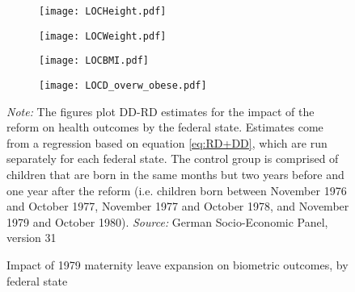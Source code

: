 \documentclass[a4paper ]{article}
\begin{document}
    
    
    
    
    
    
    
    
    
    
    
    
    
    
    
    
    
    
    
    
    
    
    
    
    
    
\clearpage
\newpage
\begin{figure}[p]
\begin{subfigure}[h]{0.48\textwidth}\centering
	\texttt{[image: LOCHeight.pdf]}
\end{subfigure}
\quad
\begin{subfigure}[h]{0.48\textwidth}\centering
	\texttt{[image: LOCWeight.pdf]}
\end{subfigure}
\par\bigskip
\begin{subfigure}[h]{0.48\textwidth}\centering
	\texttt{[image: LOCBMI.pdf]}
\end{subfigure}
\quad
\begin{subfigure}[h]{0.48\textwidth}\centering
	\texttt{[image: LOCD\_overw\_obese.pdf]}
\end{subfigure}
\caption{Impact of 1979 maternity leave expansion on biometric outcomes, by federal state}\label{fig: LOC_BM}
\begin{minipage}{\textwidth} %
{\footnotesize \textit{Note:} The figures plot DD-RD estimates for the impact of the reform on health outcomes by the federal state. Estimates come from a regression based on equation \ref{eq:RD+DD}, which are run separately for each federal state. The control group is comprised of children that are born in the same months but two years before and one year after the reform (i.e. children born between November 1976 and October 1977, November 1977 and October 1978, and November 1979 and October 1980). \newline \textit{Source: }German Socio-Economic Panel, version 31\par}
\end{minipage}
\end{figure}
\end{document}
